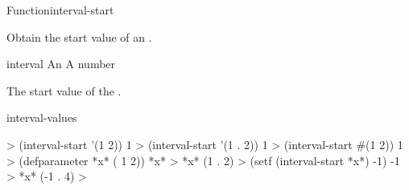 \documentclass[10pt,twoside,english,pdftex]{article}
\begin{document}
\begin{functiondoc}{Function}{interval-start}%
  { 
    }
%
%

\fnsyntax

\fnpurpose Obtain the start value of an .

\fnsetf
{}

\fnpackage {}

\fnmodule {}

\fnargs
\begin{args}{interval}
\arg[interval] An 
 A number
\end{args}

\fnreturns The start value of the .

\begin{alsos}{interval-values}
\end{alsos}

\fnexamples
%
%
\W\supp
\begin{example}
  > (interval-start '(1 2))
  1
  > (interval-start '(1 . 2))
  1
  > (interval-start #(1 2))
  1\goodpagebreak
  > (defparameter *x* ( 1 2))
  *x*
  > *x*
  (1 . 2)
  > (setf (interval-start *x*) -1)
  -1
  > *x*
  (-1 . 4)
  >
\end{example}

\end{functiondoc}

\end{document}
